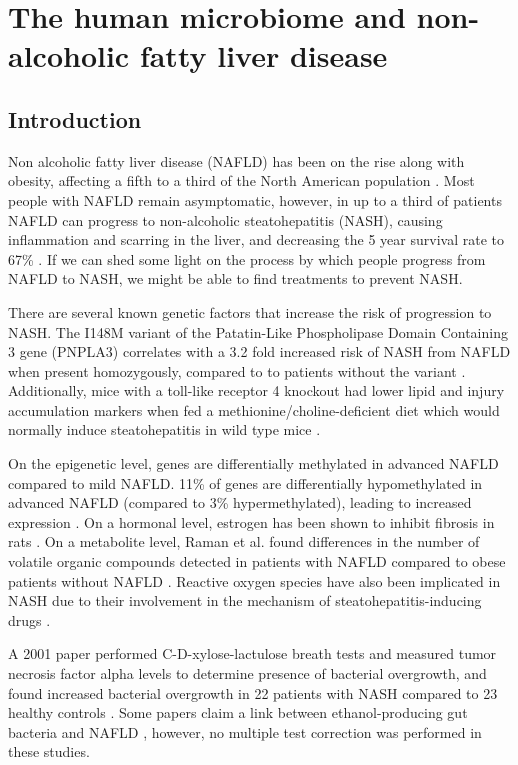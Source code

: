 \chapter{The human microbiome and non-alcoholic fatty liver disease}

\section{Introduction}
Non alcoholic fatty liver disease (NAFLD) has been on the rise along with obesity, affecting a fifth to a third of the North American population \cite{preiss2008non}. Most people with NAFLD remain asymptomatic, however, in up to a third of patients NAFLD can progress to non-alcoholic steatohepatitis (NASH), causing inflammation and scarring in the liver, and decreasing the 5 year survival rate to 67\% \cite{propst1995prognosis}. If we can shed some light on the process by which people progress from NAFLD to NASH, we might be able to find treatments to prevent NASH.

There are several known genetic factors that increase the risk of progression to NASH. The I148M variant of the Patatin-Like Phospholipase Domain Containing 3 gene (PNPLA3) correlates with a 3.2 fold increased risk of NASH from NAFLD when present homozygously, compared to to patients without the variant \cite{sookoian2011meta}. Additionally, mice with a toll-like receptor 4 knockout had lower lipid and injury accumulation markers when fed a methionine/choline-deficient diet which would normally induce steatohepatitis in wild type mice \cite{rivera2007toll}.

On the epigenetic level, genes are differentially methylated in advanced NAFLD compared to mild NAFLD. 11\% of genes are differentially hypomethylated in advanced NAFLD (compared to 3\% hypermethylated), leading to increased expression \cite{murphy2013relationship}. On a hormonal level, estrogen has been shown to inhibit fibrosis in rats \cite{yasuda1999suppressive}. On a metabolite level, Raman et al. found differences in the number of volatile organic compounds detected in patients with NAFLD compared to obese patients without NAFLD \cite{raman2013fecal}. Reactive oxygen species have also been implicated in NASH due to their involvement in the mechanism of steatohepatitis-inducing drugs \cite{berson1998steatohepatitis}.

A 2001 paper performed C-D-xylose-lactulose breath tests and measured tumor necrosis factor alpha levels to determine presence of bacterial overgrowth, and found increased bacterial overgrowth in 22 patients with NASH compared to 23 healthy controls \cite{wigg2001role}. Some papers claim a link between ethanol-producing gut bacteria and NAFLD \cite{zhu2013characterization} \cite{jiang2015dysbiosis}, however, no multiple test correction was performed in these studies.


